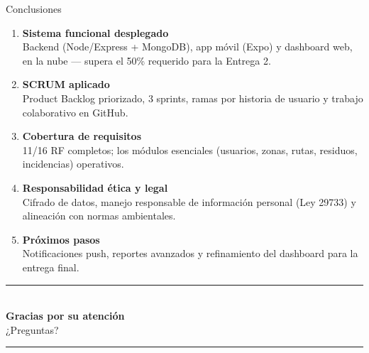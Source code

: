 \documentclass[aspectratio=169, 11pt]{beamer}
\begin{document}
\begin{frame}{Conclusiones}
    \vspace{-0.3cm}
    \begin{enumerate}
        \item \textbf{Sistema funcional desplegado}\\
        \footnotesize Backend (Node/Express + MongoDB), app móvil (Expo) y dashboard web, en la nube — supera el 50\% requerido para la Entrega 2.
        \vspace{0.1cm}
        \item \textbf{SCRUM aplicado}\\
        \footnotesize Product Backlog priorizado, 3 sprints, ramas por historia de usuario y trabajo colaborativo en GitHub.
        \vspace{0.1cm}
        \item \textbf{Cobertura de requisitos}\\
        \footnotesize 11/16 RF completos; los módulos esenciales (usuarios, zonas, rutas, residuos, incidencias) operativos.
        \vspace{0.1cm}
        \item \textbf{Responsabilidad ética y legal}\\
        \footnotesize Cifrado de datos, manejo responsable de información personal (Ley 29733) y alineación con normas ambientales.
        \vspace{0.1cm}
        \item \textbf{Próximos pasos}\\
        \footnotesize Notificaciones push, reportes avanzados y refinamiento del dashboard para la entrega final.
    \end{enumerate}
\end{frame}

\begin{frame}[plain]
    \centering
    \vspace{2.5cm}
    {\color{azulin}\rule{0.5\linewidth}{1pt}}\\[0.5cm]
    {\Large\bfseries\color{azulin} Gracias por su atención}\\[0.4cm]
    {\normalsize ¿Preguntas?}\\[0.4cm]
    {\color{azulin}\rule{0.5\linewidth}{1pt}}
\end{frame}
\end{document}

